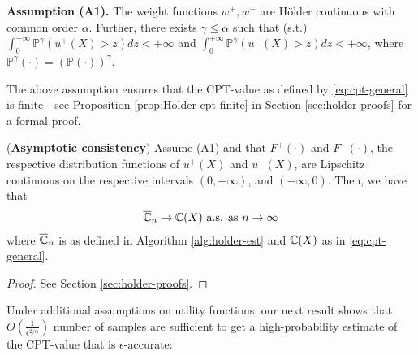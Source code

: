 \noindent\textbf{Assumption (A1).}  
The weight functions $w^+, w^-$ are H\"{o}lder continuous with common order $\alpha$. Further,
there exists $ \gamma \le \alpha$ such that (s.t.)
$\int_0^{+\infty} \mathbb{P}^{\gamma} (u^+(X)>z) dz < +\infty$ and $\int_0^{+\infty} \mathbb{P}^{\gamma} (u^-(X)>z) dz < +\infty$,
where $\mathbb{P}^{\gamma}(\cdot) = \left(\mathbb{P}(\cdot)\right)^{\gamma}$.

The above assumption ensures that the CPT-value as defined by \eqref{eq:cpt-general} is finite - see Proposition 
\ref{prop:Holder-cpt-finite} in Section \ref{sec:holder-proofs} for a formal proof.




\begin{proposition}(\textbf{Asymptotic consistency})
\label{prop:holder-asymptotic}
Assume (A1) and that $F^+(\cdot)$ and $F^-(\cdot)$, the respective distribution functions of $u^+(X)$ and $u^-(X)$, 
are Lipschitz continuous 
on the respective intervals $(0,+\infty)$, and 
$(-\infty, 0)$. Then, we have that
\begin{align}
\overline {\mathbb{C}}_n
\rightarrow
\mathbb{C}(X)
 \text{   a.s. as } n\rightarrow \infty
\end{align}
where $\overline {\mathbb{C}}_n$ is as defined in Algorithm \ref{alg:holder-est} and $\mathbb{C}(X)$ as in \eqref{eq:cpt-general}.
\end{proposition}
\begin{proof}
See Section \ref{sec:holder-proofs}. 
\end{proof}
Under additional assumptions on utility functions,
our next result shows that $O\left(\frac{1}{\epsilon^{2/\alpha}}\right)$ number of samples are sufficient to get a
high-probability estimate of the CPT-value that is $\epsilon$-accurate:

